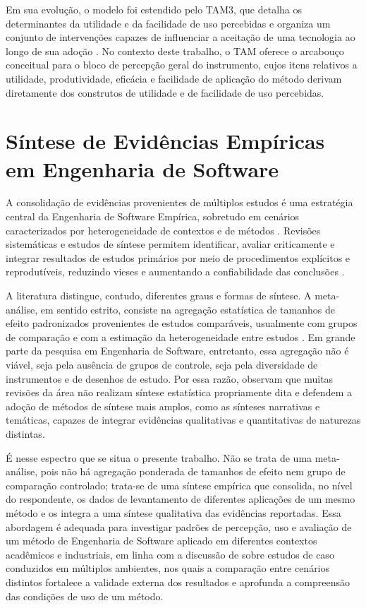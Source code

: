 Em sua evolução, o modelo foi estendido pelo TAM3, que detalha os determinantes da utilidade e da facilidade de uso percebidas e organiza um conjunto de intervenções capazes de influenciar a aceitação de uma tecnologia ao longo de sua adoção \cite{venkatesh2008}. No contexto deste trabalho, o TAM oferece o arcabouço conceitual para o bloco de percepção geral do instrumento, cujos itens relativos a utilidade, produtividade, eficácia e facilidade de aplicação do método derivam diretamente dos construtos de utilidade e de facilidade de uso percebidas.

\section{Síntese de Evidências Empíricas em Engenharia de Software}

A consolidação de evidências provenientes de múltiplos estudos é uma estratégia central da Engenharia de Software Empírica, sobretudo em cenários caracterizados por heterogeneidade de contextos e de métodos \cite{kitchenham2009}. Revisões sistemáticas e estudos de síntese permitem identificar, avaliar criticamente e integrar resultados de estudos primários por meio de procedimentos explícitos e reprodutíveis, reduzindo vieses e aumentando a confiabilidade das conclusões \cite{kitchenham2009,kitchenham2007}.

A literatura distingue, contudo, diferentes graus e formas de síntese. A meta-análise, em sentido estrito, consiste na agregação estatística de tamanhos de efeito padronizados provenientes de estudos comparáveis, usualmente com grupos de comparação e com a estimação da heterogeneidade entre estudos \cite{rodrigues2010}. Em grande parte da pesquisa em Engenharia de Software, entretanto, essa agregação não é viável, seja pela ausência de grupos de controle, seja pela diversidade de instrumentos e de desenhos de estudo. Por essa razão,  observam que muitas revisões da área não realizam síntese estatística propriamente dita e defendem a adoção de métodos de síntese mais amplos, como as sínteses narrativas e temáticas, capazes de integrar evidências qualitativas e quantitativas de naturezas distintas.

É nesse espectro que se situa o presente trabalho. Não se trata de uma meta-análise, pois não há agregação ponderada de tamanhos de efeito nem grupo de comparação controlado; trata-se de uma síntese empírica que consolida, no nível do respondente, os dados de levantamento de diferentes aplicações de um mesmo método e os integra a uma síntese qualitativa das evidências reportadas. Essa abordagem é adequada para investigar padrões de percepção, uso e avaliação de um método de Engenharia de Software aplicado em diferentes contextos acadêmicos e industriais, em linha com a discussão de  sobre estudos de caso conduzidos em múltiplos ambientes, nos quais a comparação entre cenários distintos fortalece a validade externa dos resultados e aprofunda a compreensão das condições de uso de um método.

